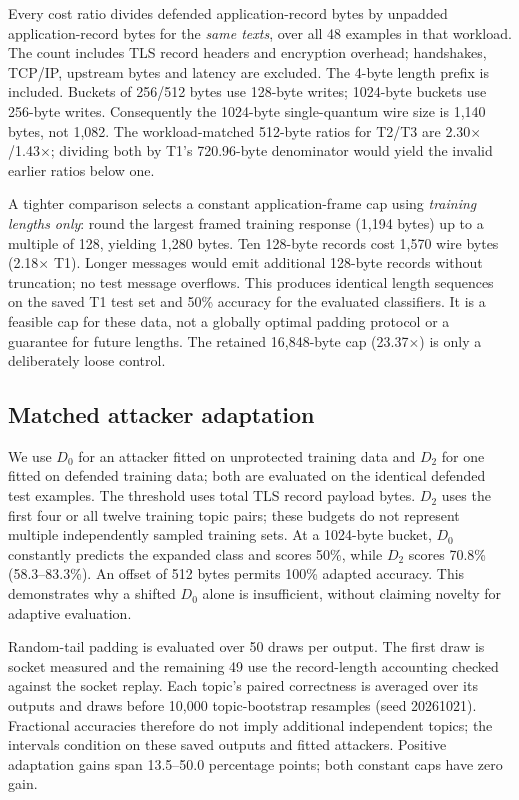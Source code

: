 Every cost ratio divides defended application-record bytes by unpadded application-record bytes for the \emph{same texts}, over all 48 examples in that workload. The count includes TLS record headers and encryption overhead; handshakes, TCP/IP, upstream bytes and latency are excluded. The 4-byte length prefix is included. Buckets of 256/512 bytes use 128-byte writes; 1024-byte buckets use 256-byte writes. Consequently the 1024-byte single-quantum wire size is 1,140 bytes, not 1,082. The workload-matched 512-byte ratios for T2/T3 are 2.30$\times$/1.43$\times$; dividing both by T1's 720.96-byte denominator would yield the invalid earlier ratios below one.

A tighter comparison selects a constant application-frame cap using \emph{training lengths only}: round the largest framed training response (1,194 bytes) up to a multiple of 128, yielding 1,280 bytes. Ten 128-byte records cost 1,570 wire bytes (2.18$\times$ T1). Longer messages would emit additional 128-byte records without truncation; no test message overflows. This produces identical length sequences on the saved T1 test set and 50\% accuracy for the evaluated classifiers. It is a feasible cap for these data, not a globally optimal padding protocol or a guarantee for future lengths. The retained 16,848-byte cap (23.37$\times$) is only a deliberately loose control.

\subsection{Matched attacker adaptation}
We use $D_0$ for an attacker fitted on unprotected training data and $D_2$ for one fitted on defended training data; both are evaluated on the identical defended test examples. The threshold uses total TLS record payload bytes. $D_2$ uses the first four or all twelve training topic pairs; these budgets do not represent multiple independently sampled training sets. At a 1024-byte bucket, $D_0$ constantly predicts the expanded class and scores 50\%, while $D_2$ scores 70.8\% (58.3--83.3\%). An offset of 512 bytes permits 100\% adapted accuracy. This demonstrates why a shifted $D_0$ alone is insufficient, without claiming novelty for adaptive evaluation.

Random-tail padding is evaluated over 50 draws per output. The first draw is socket measured and the remaining 49 use the record-length accounting checked against the socket replay. Each topic's paired correctness is averaged over its outputs and draws before 10,000 topic-bootstrap resamples (seed 20261021). Fractional accuracies therefore do not imply additional independent topics; the intervals condition on these saved outputs and fitted attackers. Positive adaptation gains span 13.5--50.0 percentage points; both constant caps have zero gain.

